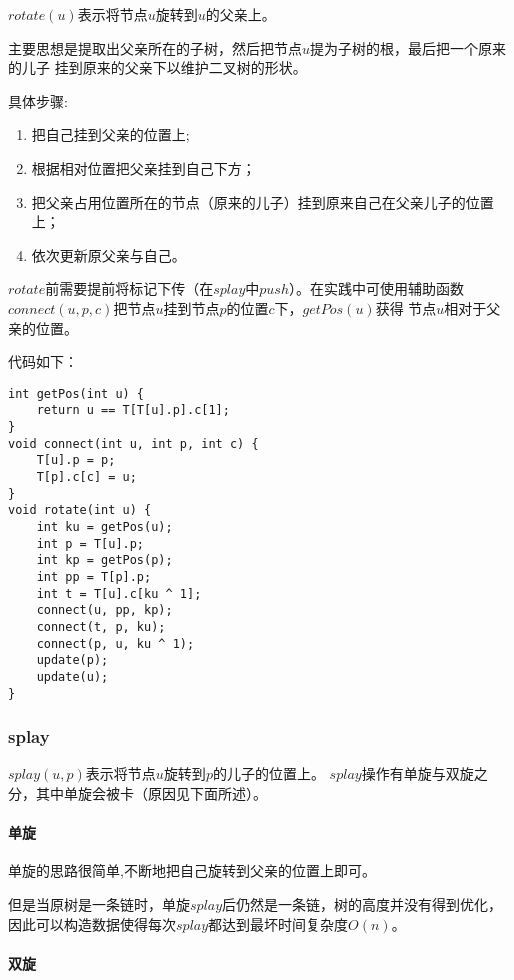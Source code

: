 $rotate(u)$表示将节点$u$旋转到$u$的父亲上。

主要思想是提取出父亲所在的子树，然后把节点$u$提为子树的根，最后把一个原来的儿子
挂到原来的父亲下以维护二叉树的形状。

具体步骤:
\begin{enumerate}
	\item 把自己挂到父亲的位置上;
	\item 根据相对位置把父亲挂到自己下方；
	\item 把父亲占用位置所在的节点（原来的儿子）挂到原来自己在父亲儿子的位置上；
	\item 依次更新原父亲与自己。
\end{enumerate}

$rotate$前需要提前将标记下传（在$splay$中$push$）。在实践中可使用辅助函数
$connect(u,p,c)$把节点$u$挂到节点$p$的位置$c$下，$getPos(u)$获得
节点$u$相对于父亲的位置。

代码如下：

\begin{lstlisting}[title=rotate]
int getPos(int u) {
    return u == T[T[u].p].c[1];
}
void connect(int u, int p, int c) {
    T[u].p = p;
    T[p].c[c] = u;
}
void rotate(int u) {
    int ku = getPos(u);
    int p = T[u].p;
    int kp = getPos(p);
    int pp = T[p].p;
    int t = T[u].c[ku ^ 1];
    connect(u, pp, kp);
    connect(t, p, ku);
    connect(p, u, ku ^ 1);
    update(p);
    update(u);
}
\end{lstlisting}

\subsubsection{splay}

$splay(u,p)$表示将节点$u$旋转到$p$的儿子的位置上。
$splay$操作有单旋与双旋之分，其中单旋会被卡（原因见下面所述）。

\paragraph{单旋}

单旋的思路很简单,不断地把自己旋转到父亲的位置上即可。

但是当原树是一条链时，单旋$splay$后仍然是一条链，树的高度并没有得到优化，
因此可以构造数据使得每次$splay$都达到最坏时间复杂度$O(n)$。

\paragraph{双旋}

